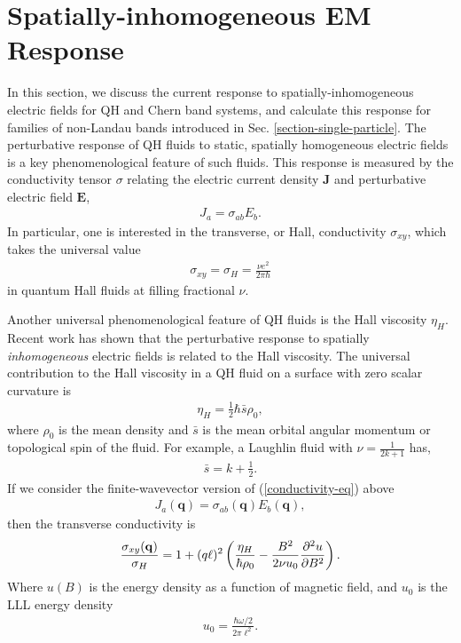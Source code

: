\documentclass[aps,prb,twocolumn,letterpaper,twoside,nobalancelastpage,groupedaddress,amsmath,amssymb,floatfix,citeautoscript]{revtex4-1}
\begin{document}
\section{Spatially-inhomogeneous EM Response}
In this section, we discuss the current response to spatially-inhomogeneous electric fields for QH and Chern band systems, and calculate this response for families of non-Landau bands introduced in Sec. \ref{section-single-particle}. The perturbative response of QH fluids to static, spatially homogeneous electric fields is a key phenomenological feature of such fluids. This response is measured by the conductivity tensor $\sigma$ relating the electric current density $\mathbf{J}$ and perturbative electric field $\mathbf{E}$,
\begin{align}
\label{conductivity-eq}
J_{a} = \sigma_{ab}E_b.
\end{align}
In particular, one is interested in the transverse, or Hall, conductivity $\sigma_{xy}$, which takes the universal value
\begin{align*}
\sigma_{xy} = \sigma_{H} = \frac{\nu e^2}{2\pi \hbar}
\end{align*}
in quantum Hall fluids at filling fractional $\nu$.

Another universal phenomenological feature of QH fluids is the Hall viscosity $\eta_H$. \cite{avron_viscosity_1995,tokatly_lorentz_2007,Read2009} Recent work has shown that the perturbative response to spatially \textit{inhomogeneous} electric fields is related to the Hall viscosity. \cite{hoyos_hall_2012,bradlyn_kubo_2012} The universal contribution to the Hall viscosity in a QH fluid on a surface with zero scalar curvature is \cite{Read2009}
\begin{align*}
\eta_H = \frac{1}{2}\hbar\bar{s}\rho_0,
\end{align*}
where $\rho_0$ is the mean density and $\bar{s}$ is the mean orbital angular momentum or topological spin of the fluid. For example, a Laughlin fluid with $\nu = \frac{1}{2k+1}$ has,
\begin{align*}
\bar{s} = k + \frac{1}{2}.
\end{align*}
If we consider the finite-wavevector version of (\ref{conductivity-eq}) above
\begin{align*}
J_{a}(\mathbf{q}) = \sigma_{ab}(\mathbf{q})E_b(\mathbf{q}),
\end{align*}
then the transverse conductivity is
\begin{align*}
\frac{\sigma_{xy}(\mathbf{q})}{\sigma_H} = 1 + (q\ell)^2\left(\frac{\eta_H}{\hbar \rho_0} - \frac{B^2}{2\nu u_{0}}\pdv[2]{u}{B}\right).
\end{align*}
Where $u(B)$ is the energy density as a function of magnetic field, and $u_0$ is the LLL energy density 
\begin{align*}
u_{0} = \frac{\hbar\omega/2}{2\pi\ell^2}.
\end{align*}
\end{document}
